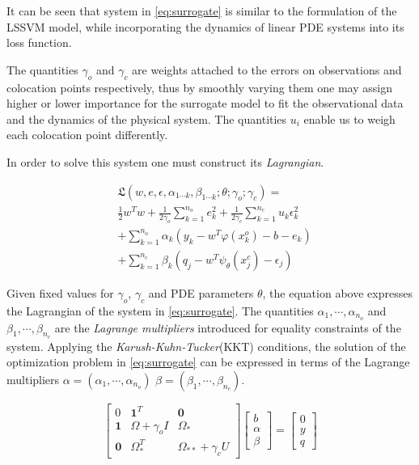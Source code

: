 It can be seen that system in \cref{eq:surrogate} is similar to the
formulation of the LSSVM model, while incorporating the dynamics of
linear PDE systems into its loss function. 

The quantities $\gamma_{o}$ and $\gamma_{c}$ are weights attached to
the errors on observations and colocation points respectively, thus
by smoothly varying them one may assign higher or lower importance for
the surrogate model to fit the observational data and the dynamics of
the physical system. The quantities $u_i$ enable us to weigh each colocation
point differently.

In order to solve this system one must construct its
\emph{Lagrangian}.

\begin{align*}\label{eq:lag}
      & \mathfrak{L}(w,e,\epsilon, \alpha_{1 \cdots k}, \beta_{1 \cdots k}; \theta; \gamma_{o}; \gamma_{c}) = \\ 
      & \frac{1}{2} w^{T}w + \frac{1}{2\gamma_{o}} \sum_{k = 1}^{n_{o}}{e^{2}_{k}} +
      \frac{1}{2\gamma_{c}} \sum_{k = 1}^{n_{c}}{u_{k} \epsilon^{2}_{k}} \\
      & + \sum_{k = 1}^{n_{o}}{\alpha_{k}(y_{k} - w^{T}\varphi(x^{o}_{k}) - b - e_{k})} \\
      & + \sum_{k = 1}^{n_{c}}{\beta_{k} (q_{j} - w^{T}\psi_{\theta}(x^{c}_{j}) - \epsilon_{j})} 
\end{align*}

Given fixed values for $\gamma_{o}$, $\gamma_{c}$ and PDE parameters
$\theta$, the equation above expresses the Lagrangian of the system in 
\cref{eq:surrogate}. The quantities $\alpha_{1}, \cdots, \alpha_{n_{o}}$ and
$\beta_{1}, \cdots, \beta_{n_{c}}$ are the \emph{Lagrange multipliers}
introduced for equality constraints of the system. Applying the
\emph{Karush-Kuhn-Tucker}(KKT) conditions, the solution of the
optimization problem in \cref{eq:surrogate} can be expressed in terms of
the Lagrange multipliers $\alpha = (\alpha_{1}, \cdots, \alpha_{n_{o}})$
$\beta = (\beta_{1}, \cdots, \beta_{n_{c}})$.

\begin{equation}\label{eq:solution}
  \begin{bmatrix}
    0 & \mathbf{1}^{T} & \mathbf{0} \\ 
    \mathbf{1} & \Omega + \gamma_{o}I  & \Omega_*\\ 
    \mathbf{0} & \Omega_{*}^{T}  & \Omega_{**} + \gamma_{c}U 
  \end{bmatrix} \begin{bmatrix}
    b\\ 
    \alpha\\ 
    \beta
  \end{bmatrix} = \begin{bmatrix}
    0\\ 
    y\\ 
    q
  \end{bmatrix}
\end{equation}

